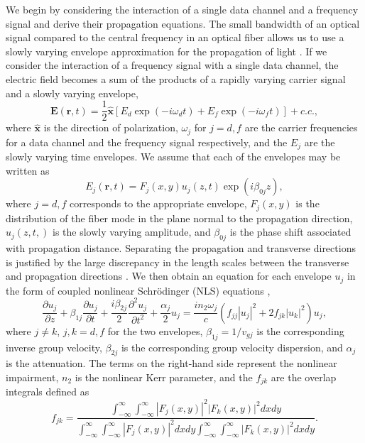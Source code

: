 We begin by considering the interaction of a single data channel and a frequency signal and derive their propagation equations. The small bandwidth of an optical signal compared to the central frequency in an optical fiber allows us to use a slowly varying envelope approximation for the propagation of light \cite{Agrawal2013}. If we consider the interaction of a frequency signal with a single data channel, the electric field becomes a sum of the products of a rapidly varying carrier signal and a slowly varying envelope,
%
\begin{equation}
\mathbf{E}(\mathbf{r}, t) = \frac{1}{2}\hat{\mathbf{x}}\left[ E_d\exp(-i\omega_dt) + E_f\exp(-i\omega_ft)\right] + c.c.,
\end{equation}
%
where $\hat{\mathbf{x}}$ is the direction of polarization, $\omega_j$ for $j=d,f$ are the carrier frequencies for a data channel and the frequency signal respectively, and the $E_j$ are the slowly varying time envelopes. We assume that each of the envelopes may be written as
%
\begin{equation}
E_j(\mathbf{r}, t) = F_j(x,y)u_j(z,t)\exp(i\beta_{0j}z),
\end{equation}
%
where $j=d,f$ corresponds to the appropriate envelope, $F_j(x,y)$ is the distribution of the fiber mode in the plane normal to the propagation direction, $u_j(z,t,)$ is the slowly varying amplitude, and $\beta_{0j}$ is the phase shift associated with propagation distance. Separating the propagation and transverse directions is justified by the large discrepancy in the length scales between the transverse and propagation directions \cite{Agrawal2013}. We then obtain an equation for each envelope $u_j$ in the form of coupled nonlinear Schr{\"o}dinger (NLS) equations \cite{Agrawal2013},
%
\begin{equation}
\frac{\partial u_j}{\partial z} + \beta_{1j}\frac{\partial u_j}{\partial t} + \frac{i\beta_{2j}}{2}\frac{\partial^2 u_j}{\partial t^2} + \frac{\alpha_j}{2}u_j = \frac{in_2\omega_j}{c}\left(f_{jj}|u_j|^2 + 2f_{jk}|u_k|^2\right)u_j,
\end{equation}
%
where $j\neq k$, $j,k = d,f$ for the two envelopes, $\beta_{1j} = 1/v_{gj}$ is the corresponding inverse group velocity, $\beta_{2j}$ is the corresponding group velocity dispersion, and $\alpha_j$ is the attenuation. The terms on the right-hand side represent the nonlinear impairment, $n_2$ is the nonlinear Kerr parameter, and the $f_{jk}$ are the overlap integrals defined as
%
\begin{equation}
f_{jk} = \frac{\int_{-\infty}^{\infty}\int_{-\infty}^{\infty} |F_j(x,y)|^2|F_k(x,y)|^2dxdy }{\int_{-\infty}^{\infty}\int_{-\infty}^{\infty} |F_j(x,y)|^2dxdy\int_{-\infty}^{\infty}\int_{-\infty}^{\infty}|F_k(x,y)|^2dxdy}.
\end{equation}
